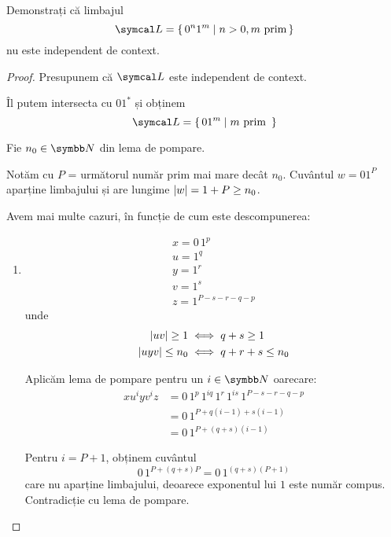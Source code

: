 \begin{exercise}
    Demonstrați că limbajul
    \[\limbaj = \set{ 0^n 1^m | n > 0, m \text{ prim} }\]
    nu este independent de context.
\end{exercise}
\begin{proof}
    Presupunem că \(\limbaj\) este independent de context.

    Îl putem intersecta cu \(0 1^*\) și obținem
    \[\limbaj = \set{ 0 1^m | m \text{ prim } }\]

    Fie \(n_0 \in \naturals\) din lema de pompare.

    Notăm cu \(P\) = următorul număr prim mai mare decât \(n_0\).
    Cuvântul \(w = 0 1^P\) aparține limbajului și are lungime \(\left\lvert w\right\rvert = 1 + P \geq n_0\).

    Avem mai multe cazuri, în funcție de cum este descompunerea:
    \begin{enumerate}
        \item
              \begin{gather*}
                  x = 0 \, 1^p \\
                  u = 1^q \\
                  y = 1^r \\
                  v = 1^s \\
                  z = 1^{P - s - r - q - p}
              \end{gather*}
              unde
              \begin{align*}
                  \left\lvert u v\right\rvert \geq 1     & \iff q + s \geq 1       \\
                  \left\lvert u y v\right\rvert \leq n_0 & \iff q + r + s \leq n_0
              \end{align*}

              Aplicăm lema de pompare pentru un \(i \in \naturals\) oarecare:
              \begin{align*}
                  x u^i y v^i z & = 0 \, 1^p \, 1^{iq} \, 1^r \, 1^{is} \, 1^{P - s - r - q - p} \\
                                & = 0 \, 1^{P + q(i - 1) + s(i - 1)}                             \\
                                & = 0 \, 1^{P + (q + s)(i - 1)}
              \end{align*}

              Pentru \(i = P + 1\), obținem cuvântul
              \[0 \, 1^{P + (q + s) P} = 0 \, 1^{(q + s)(P + 1)}\]
              care nu aparține limbajului, deoarece exponentul lui \(1\) este număr compus. Contradicție cu lema de pompare.


\end{enumerate}
\end{proof}
